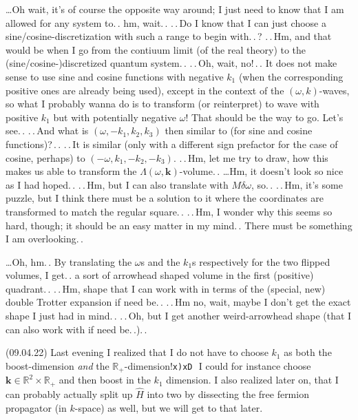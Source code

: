\documentclass{report}
\begin{document}
\ldots Oh wait, it's of course the opposite way around; I just need to know that I am allowed for any system to.\,. hm, wait.\,. .\,.\,Do I know that I can just choose a sine/cosine-discretization with such a range to begin with.\,.\,? .\,.\,Hm, and that would be when I go from the contiuum limit (of the real theory) to the (sine/cosine-)discretized quantum system.\,. .\,.\,Oh, wait, no!\,.\,. It does not make sense to use sine and cosine functions with negative $k_1$ (when the corresponding positive ones are already being used), except in the context of the $(\omega, k)$-waves, so what I probably wanna do is to transform (or reinterpret) to wave with positive $k_1$ but with potentially negative $\omega$! That should be the way to go. Let's see.\,. %
.\,.\,And what is $(\omega, -k_1, k_2, k_3)$ then similar to (for sine and cosine functions)?\,.\,. .\,.\,It is similar (only with a different sign prefactor for the case of cosine, perhaps) to $(-\omega, k_1, -k_2, -k_3)$. .\,.\,Hm, let me try to draw, how this makes us able to transform the $\Lambda(\omega, \boldsymbol{k})$-volume.\,. \ldots Hm, it doesn't look so nice as I had hoped.\,. %
.\,.\,Hm, but I can also translate with $M\delta \omega$, so.\,. .\,.\,Hm, it's some puzzle, but I think there must be a solution to it where the coordinates are transformed to match the regular square.\,. .\,.\,Hm, I wonder why this seems so hard, though; it should be an easy matter in my mind.\,. There must be something I am overlooking.\,. %

\ldots Oh, hm.\,. By translating the $\omega$s and the $k_1$s respectively for the two flipped volumes, I get.\,. a sort of arrowhead shaped volume in the first (positive) quadrant.\,. .\,.\,Hm, shape that I can work with in terms of the (special, new) double Trotter expansion if need be.\,. .\,.\,Hm no, wait, maybe I don't get the exact shape I just had in mind.\,. .\,.\,Oh, but I get another weird-arrowhead shape (that I can also work with if need be.\,.).\,. %


(09.04.22) 
Last evening I realized that I do not have to choose $k_1$ as both the boost-dimension \emph{and} the $\mathbb{R}_+$-dimension!\texttt{x)xD}\,\, I could for instance choose $\boldsymbol{k}\in\mathbb{R}^2 \times \mathbb{R}_+$ and then boost in the $k_1$ dimension. I also realized later on, that I can probably actually split up $\hat H$ into two by dissecting the free fermion propagator (in $k$-space) as well, but we will get to that later.
\end{document}
